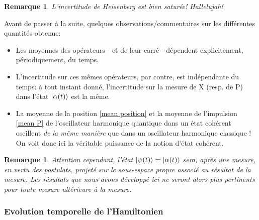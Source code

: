\documentclass[11pt,oneside,a4paper]{article}
\newtheorem{remark}[theorem]{Remarque}
\begin{document}
\begin{remark}
  L'incertitude de Heisenberg est bien saturée! Hallelujah!
\end{remark}

Avant de passer à la suite, quelques observations/commentaires sur les différentes quantités obtenue:
\begin{itemize}
  \item Les moyennes des opérateurs - et de leur carré - dépendent explicitement, périodiquement, du temps.
  \item L'incertitude sur ces mêmes opérateurs, par contre, est indépendante du temps: à tout instant donné, l'incertitude sur la mesure de X (resp. de P) dans l'état $\ket{\alpha(t)}$ est la même.
  \item La moyenne de la position \eqref{mean position} et la moyenne de l'impulsion \eqref{mean P} de l'oscillateur harmonique quantique dans un état cohérent oscillent \emph{de la même manière} que dans un oscillateur harmonique classique ! On voit donc ici la véritable puissance de la notion d'état cohérent.
\end{itemize} 

\begin{remark}
  Attention cependant, l'état $\ket{\psi(t)} = \ket{\alpha(t)}$ sera, après une mesure, en vertu des postulats, projeté sur le sous-espace propre associé au résultat de la mesure. Les résultats que nous avons développé ici ne seront alors plus pertinents pour toute mesure ultérieure à la mesure.
\end{remark}

\subsubsection{Evolution temporelle de l'Hamiltonien}
\end{document}
